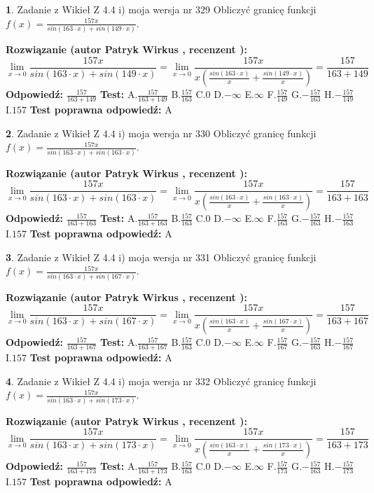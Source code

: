 \documentclass[12pt, a4paper]{article}
\theoremstyle{definition} %
\newtheorem{zad}{}
\newcommand{\zadStart}[1]{\begin{zad}#1\newline}
\newcommand{\zadStop}{\end{zad}}
\newcommand{\rozwStart}[2]{\noindent \textbf{Rozwiązanie (autor #1 , recenzent #2): }\newline}
\newcommand{\rozwStop}{\newline}
\newcommand{\odpStart}{\noindent \textbf{Odpowiedź:}\newline}
\newcommand{\odpStop}{\newline}
\newcommand{\testStart}{\noindent \textbf{Test:}\newline}
\newcommand{\testStop}{\newline}
\newcommand{\kluczStart}{\noindent \textbf{Test poprawna odpowiedź:}\newline}
\newcommand{\kluczStop}{\newline}
\begin{document}
\zadStart{Zadanie z Wikieł Z 4.4 i) moja wersja nr 329}
Obliczyć granicę funkcji $f(x)=\frac{157x}{sin(163\cdot x) +sin(149\cdot x)}$.
\zadStop
\rozwStart{Patryk Wirkus}{}
$$\lim\limits_{x\to 0}\frac{157x}{sin(163\cdot x) +sin(149\cdot x)}=\lim\limits_{x\to 0}\frac{157x}{x(\frac{sin(163\cdot x)}{x}+\frac{sin(149\cdot x)}{x})}=\frac{157}{163+149}$$
\rozwStop
\odpStart
$\frac{157}{163+149}$
\odpStop
\testStart
A.$\frac{157}{163+149}$
B.$\frac{157}{163}$
C.$0$
D.$-\infty$
E.$\infty$
F.$\frac{157}{149}$
G.$-\frac{157}{163}$
H.$-\frac{157}{149}$
I.$157$
\testStop
\kluczStart
A
\kluczStop



\zadStart{Zadanie z Wikieł Z 4.4 i) moja wersja nr 330}
Obliczyć granicę funkcji $f(x)=\frac{157x}{sin(163\cdot x) +sin(163\cdot x)}$.
\zadStop
\rozwStart{Patryk Wirkus}{}
$$\lim\limits_{x\to 0}\frac{157x}{sin(163\cdot x) +sin(163\cdot x)}=\lim\limits_{x\to 0}\frac{157x}{x(\frac{sin(163\cdot x)}{x}+\frac{sin(163\cdot x)}{x})}=\frac{157}{163+163}$$
\rozwStop
\odpStart
$\frac{157}{163+163}$
\odpStop
\testStart
A.$\frac{157}{163+163}$
B.$\frac{157}{163}$
C.$0$
D.$-\infty$
E.$\infty$
F.$\frac{157}{163}$
G.$-\frac{157}{163}$
H.$-\frac{157}{163}$
I.$157$
\testStop
\kluczStart
A
\kluczStop



\zadStart{Zadanie z Wikieł Z 4.4 i) moja wersja nr 331}
Obliczyć granicę funkcji $f(x)=\frac{157x}{sin(163\cdot x) +sin(167\cdot x)}$.
\zadStop
\rozwStart{Patryk Wirkus}{}
$$\lim\limits_{x\to 0}\frac{157x}{sin(163\cdot x) +sin(167\cdot x)}=\lim\limits_{x\to 0}\frac{157x}{x(\frac{sin(163\cdot x)}{x}+\frac{sin(167\cdot x)}{x})}=\frac{157}{163+167}$$
\rozwStop
\odpStart
$\frac{157}{163+167}$
\odpStop
\testStart
A.$\frac{157}{163+167}$
B.$\frac{157}{163}$
C.$0$
D.$-\infty$
E.$\infty$
F.$\frac{157}{167}$
G.$-\frac{157}{163}$
H.$-\frac{157}{167}$
I.$157$
\testStop
\kluczStart
A
\kluczStop



\zadStart{Zadanie z Wikieł Z 4.4 i) moja wersja nr 332}
Obliczyć granicę funkcji $f(x)=\frac{157x}{sin(163\cdot x) +sin(173\cdot x)}$.
\zadStop
\rozwStart{Patryk Wirkus}{}
$$\lim\limits_{x\to 0}\frac{157x}{sin(163\cdot x) +sin(173\cdot x)}=\lim\limits_{x\to 0}\frac{157x}{x(\frac{sin(163\cdot x)}{x}+\frac{sin(173\cdot x)}{x})}=\frac{157}{163+173}$$
\rozwStop
\odpStart
$\frac{157}{163+173}$
\odpStop
\testStart
A.$\frac{157}{163+173}$
B.$\frac{157}{163}$
C.$0$
D.$-\infty$
E.$\infty$
F.$\frac{157}{173}$
G.$-\frac{157}{163}$
H.$-\frac{157}{173}$
I.$157$
\testStop
\kluczStart
A
\kluczStop
\end{document}
